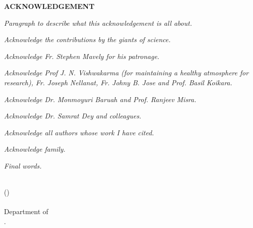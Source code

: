 \pagestyle{empty}
\begin{titlepage}
    \begin{center}
        {\bf\large{ACKNOWLEDGEMENT}}
    \end{center}
    \def\baselinestretch{1.0}
    \par\textsl{Paragraph to describe what this acknowledgement is all about.}
    
    \par\textsl{Acknowledge the contributions by the giants of science.}
    
    \par\textsl{Acknowledge Fr. Stephen Mavely for his patronage.}
    
    \par\textsl{Acknowledge Prof J. N. Vishwakarma (for maintaining a healthy atmosphere for research), Fr. Joseph Nellanat, Fr. Johny B. Jose and Prof. Basil Koikara.}
    
    \par\textsl{Acknowledge Dr. Monmoyuri Baruah and Prof. Ranjeev Misra.}
    
    \par\textsl{Acknowledge Dr. Samrat Dey and colleagues.}
    
    \par\textsl{Acknowledge all authors whose work I have cited.}
    
    \par\textsl{Acknowledge family.}
    
    \par\textsl{Final words.}
    
    \bigskip\medskip
    \bigskip\medskip
    \bigskip\medskip\bigskip\medskip
    \noindent\\
    \hfill (\authorname)
    \noindent\\
    \hfill {\submissiontime} \\
    \hfill Department of \department\\
    \hfill \university.
\end{titlepage}